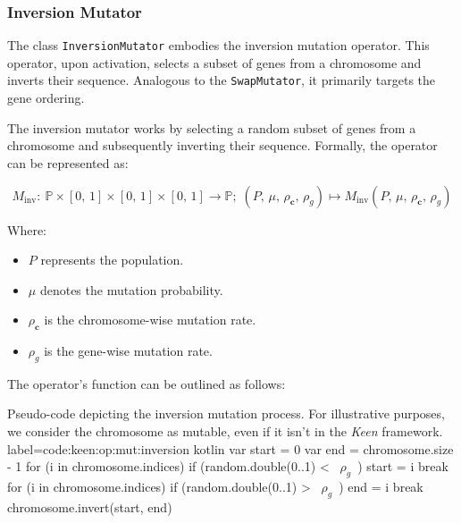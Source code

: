 
\subsubsection{Inversion Mutator}
\label{sec:keen:op:mut:inversion}
  The class \texttt{InversionMutator} embodies the inversion mutation operator. 
  This operator, upon activation, selects a subset of genes from a chromosome 
  and inverts their sequence. Analogous to the \texttt{SwapMutator}, it 
  primarily targets the gene ordering.

  \begin{definition}
  \label{def:keen:op:mut:inversion}
    The inversion mutator works by selecting a random subset of genes from a 
    chromosome and subsequently inverting their sequence. Formally, the 
    operator can be represented as:

    \begin{equation}
      M_\mathrm{inv} :\: 
        \mathbb{P} \times [0,\, 1] \times [0,\, 1] \times [0,\, 1] 
          \to \mathbb{P};\;
      (P,\, \mu,\, \rho_\mathbf{c},\, \rho_g) 
        \mapsto M_\mathrm{inv}(P,\, \mu,\, \rho_\mathbf{c},\, \rho_g)
    \end{equation}

    Where:
    \begin{itemize}
        \item \(P\) represents the population.
        \item \(\mu\) denotes the mutation probability.
        \item \(\rho_\mathbf{c}\) is the chromosome-wise mutation rate.
        \item \(\rho_g\) is the gene-wise mutation rate.
    \end{itemize}
  \end{definition}

  The operator's function can be outlined as follows:

  \begin{code}{
      Pseudo-code depicting the inversion mutation process. For illustrative purposes, we consider the chromosome as mutable, even if it isn't in the \textit{Keen} framework.
    }{
      label=code:keen:op:mut:inversion
    }{kotlin}
      var start = 0
      var end = chromosome.size - 1
      for (i in chromosome.indices) {
          if (random.double(0..1) < ~$\rho_g$~) {
              start = i
              break
          }
      }
      for (i in chromosome.indices) {
          if (random.double(0..1) > ~$\rho_g$~) {
              end = i
              break
          }
      }
      chromosome.invert(start, end)
  \end{code}

